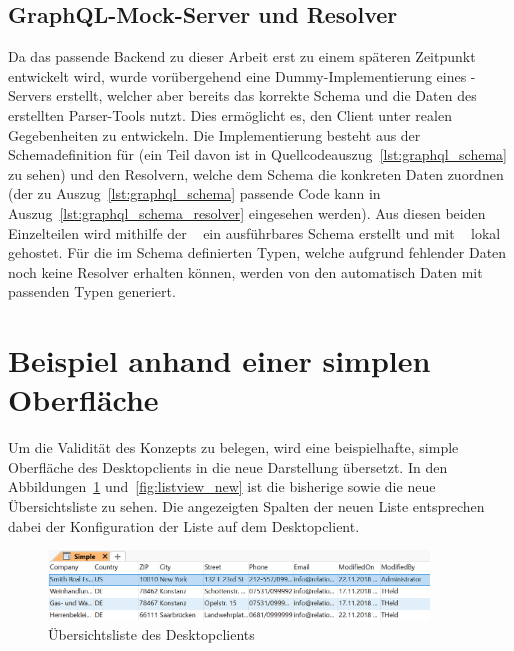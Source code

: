 \subsection{GraphQL-Mock-Server und Resolver}
Da das passende Backend zu dieser Arbeit erst zu einem späteren Zeitpunkt entwickelt wird, wurde vorübergehend eine Dummy-Implementierung eines -Servers erstellt, welcher aber bereits das korrekte Schema und die Daten des erstellten Parser-Tools nutzt. Dies ermöglicht es, den Client unter realen Gegebenheiten zu entwickeln. Die Implementierung besteht aus der Schemadefinition für  (ein Teil davon ist in Quellcodeauszug~\ref{lst:graphql_schema} zu sehen) und den Resolvern, welche dem Schema die konkreten Daten zuordnen (der zu Auszug~\ref{lst:graphql_schema} passende Code kann in Auszug~\ref{lst:graphql_schema_resolver} eingesehen werden). Aus diesen beiden Einzelteilen wird mithilfe der ~\parencite*{apollo_graphql-tools_2019} ein ausführbares Schema erstellt und mit ~\parencite{express_graphql_2018} lokal gehostet. Für die im Schema definierten Typen, welche aufgrund fehlender Daten noch keine Resolver erhalten können, werden von den  automatisch Daten mit passenden Typen generiert.





\section{Beispiel anhand einer simplen Oberfläche}
Um die Validität des Konzepts zu belegen, wird eine beispielhafte, simple Oberfläche des  Desktopclients in die neue Darstellung übersetzt. In den Abbildungen~\ref{fig:listview_crm} und~\ref{fig:listview_new} ist die bisherige sowie die neue Übersichtsliste zu sehen. Die angezeigten Spalten der neuen Liste entsprechen dabei der Konfiguration der Liste auf dem Desktopclient. 

\begin{figure}[htb]
    \centering
    \captionsetup{justification=centering}
    \includegraphics[width=0.9\textwidth]{figures/listview_crm.png}
        \caption{Übersichtsliste des Desktopclients}\label{fig:listview_crm}
\end{figure}

